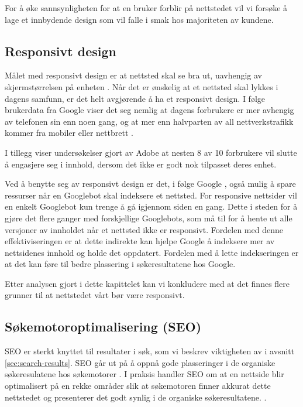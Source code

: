 For å øke sannsynligheten for at en bruker forblir på nettstedet vil vi forsøke å lage et innbydende design som vil falle i smak hos majoriteten av kundene.

\subsection{Responsivt design}
Målet med responsivt design er at nettsted skal se bra ut, uavhengig av skjermstørrelsen på enheten \cite{kim2013rwd}. Når det er ønskelig at et nettsted skal lykkes i dagens samfunn, er det helt avgjørende å ha et responsivt design.  I følge brukerdata fra Google \cite{google16hms} viser det seg nemlig at dagens forbrukere er mer avhengig av telefonen sin enn noen gang, og at mer enn halvparten av all nettverkstrafikk kommer fra mobiler eller nettbrett . 

I tillegg viser undersøkelser gjort av Adobe \cite{stark2015frf} at nesten 8 av 10 forbrukere vil slutte å engasjere seg i innhold, dersom det ikke er godt nok tilpasset deres enhet.

Ved å benytte seg av responsivt design er det, i følge Google \cite{google2018rwd}, også mulig å spare ressurser når en Googlebot skal indeksere et nettsted. For responsive nettsider vil en enkelt Googlebot kun trenge å gå igjennom siden en gang. Dette i steden for å gjøre det flere ganger med forskjellige Googlebots, som må til for å hente ut alle versjoner av innholdet når et nettsted ikke er responsivt. Fordelen med denne effektiviseringen er at dette indirekte kan hjelpe Google å indeksere mer av nettsidenes innhold og holde det oppdatert. Fordelen med å lette indekseringen er at det kan føre til bedre plassering i søkeresultatene hos Google.  

Etter analysen gjort i dette kapittelet kan vi konkludere med at det finnes flere grunner til at nettstedet vårt bør være responsivt.

\subsection{Søkemotoroptimalisering (SEO)}
\label{sec:concepts-seo}
SEO er sterkt knyttet til resultater i søk, som vi beskrev viktigheten av i avsnitt \ref{sec:search-results}. SEO går ut på å oppnå gode plasseringer i de organiske søkeresulatene hos søkemotorer \cite[s.~16]{flensted10smg}. I praksis handler SEO om at en nettside blir optimalisert på en rekke områder slik at søkemotoren finner akkurat dette nettstedet og presenterer det godt synlig i de organiske søkeresultatene. \cite[s.~20]{flensted10smg}.

